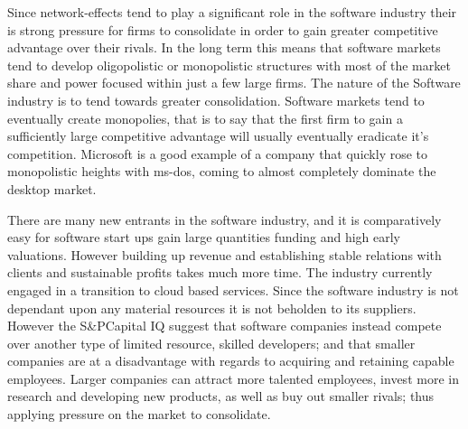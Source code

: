 Since network-effects tend to play a significant role in the software industry their is strong pressure for firms to consolidate in order to gain greater competitive advantage over their rivals.\autocite[422]{schief2013mergers}
In the long term this means that software markets tend to develop oligopolistic or monopolistic structures with most of the market share and power focused within just a few large firms.\autocite[422]{schief2013mergers}
The nature of the Software industry is to tend towards greater consolidation.\autocite[]{LargeParadigmShiftCloudComputing}
Software markets tend to eventually create monopolies, that is to say that the first firm to gain a sufficiently large competitive advantage will usually eventually eradicate it's competition.\autocite[4]{buxmann2012software}
Microsoft is a good example of a company that quickly rose to monopolistic heights with ms-dos, coming to almost completely dominate the desktop market.\autocite[4]{buxmann2012software}

There are many new entrants in the software industry, and it is comparatively easy for software start ups gain large quantities funding and high early valuations. However building up revenue and establishing stable relations with clients and sustainable profits takes much more time.\autocite[39]{SurveysSoftware2015}
The industry currently engaged in a transition to cloud based services.\autocite[39]{SurveysSoftware2015}
Since the software industry is not dependant upon any material resources it is not beholden to its suppliers. However the S\&PCapital IQ suggest that software companies instead compete over another type of limited resource, skilled developers; and that smaller companies are at a disadvantage with regards to acquiring and retaining capable employees.\autocite[39]{SurveysSoftware2015}
Larger companies can attract more talented employees, invest more in research and developing new products, as well as buy out smaller rivals; thus applying pressure on the market to consolidate.\autocite[34]{IndustrySurveysInternet}


